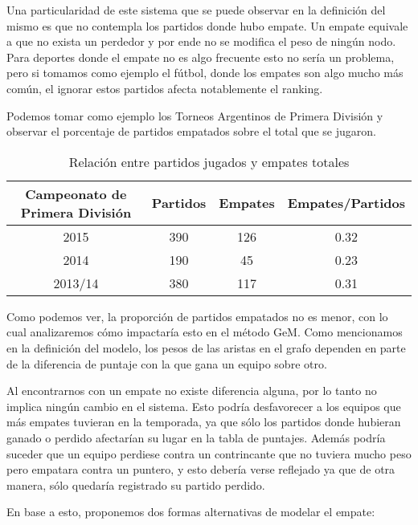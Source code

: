 Una particularidad de este sistema que se puede observar en la definición del
mismo es que no contempla los partidos donde hubo empate. Un empate equivale
a que no exista un perdedor y por ende no se modifica el peso de ningún nodo.
Para deportes donde el empate no es algo frecuente esto no sería un problema,
pero si tomamos como ejemplo el fútbol, donde los empates son algo mucho más
común, el ignorar estos partidos afecta notablemente el ranking.

Podemos tomar como ejemplo los Torneos Argentinos de Primera División y
observar el porcentaje de partidos empatados sobre el total que se jugaron.

\begin{table}[H]
	\centering
	\begin{tabular}{|cccc|}
		\hline
		Campeonato de Primera División & Partidos & Empates &  Empates/Partidos \\ \hline
		2015 & 390 & 126 & 0.32 \\ \hline
		2014 & 190 & 45 & 0.23 \\ \hline
		2013/14 & 380 & 117 & 0.31 \\ \hline
	\end{tabular}
	\caption*{Relación entre partidos jugados y empates totales}
\end{table}

Como podemos ver, la proporción de partidos empatados no es menor, con lo cual
analizaremos cómo impactaría esto en el método GeM. Como mencionamos en la
definición del modelo, los pesos de las aristas en el grafo dependen en parte de la
diferencia de puntaje con la que gana un equipo sobre otro.

Al encontrarnos con un empate no existe diferencia alguna, por lo tanto no
implica ningún cambio en el sistema. Esto podría desfavorecer a los equipos que
más empates tuvieran en la temporada, ya que sólo los partidos donde hubieran
ganado o perdido afectarían su lugar en la tabla de puntajes. Además podría
suceder que un equipo perdiese contra un contrincante que no tuviera mucho peso
pero empatara contra un puntero, y esto debería verse reflejado ya que de otra
manera, sólo quedaría registrado su partido perdido.

En base a esto, proponemos dos formas alternativas de modelar el empate:

